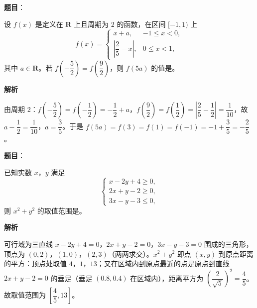 \begin{answer}

\textbf{题目}：

设 \(f(x)\) 是定义在 \(\mathbf{R}\) 上且周期为 2 的函数，在区间 \([-1,1)\) 上
\nopagebreak[4]
\[
f(x)=
\begin{cases}
x+a, & -1\leqslant x<0,\\
\left|\dfrac{2}{5}-x\right|, & 0\leqslant x<1,
\end{cases}
\]
其中 \(a\in\mathbf{R}\)。若 \(f\left(-\dfrac{5}{2}\right)=f\left(\dfrac{9}{2}\right)\)，则 \(f(5a)\) 的值是\gkblank{}。

\textbf{解析}

由周期 2：\(f\left(-\dfrac{5}{2}\right)=f\left(-\dfrac{1}{2}\right)=-\dfrac{1}{2}+a\)，\(f\left(\dfrac{9}{2}\right)=f\left(\dfrac{1}{2}\right)=\left|\dfrac{2}{5}-\dfrac{1}{2}\right|=\dfrac{1}{10}\)，故 \(a-\dfrac{1}{2}=\dfrac{1}{10}\)，\(a=\dfrac{3}{5}\)。于是 \(f(5a)=f(3)=f(1)=f(-1)=-1+\dfrac{3}{5}=-\dfrac{2}{5}\)。


\end{answer}
\begin{answer}

\textbf{题目}：

已知实数 \(x\)，\(y\) 满足
\nopagebreak[4]
\[
\begin{cases}
x-2y+4\geqslant 0,\\
2x+y-2\geqslant 0,\\
3x-y-3\leqslant 0,
\end{cases}
\]
则 \(x^{2}+y^{2}\) 的取值范围是\gkblank{}。

\textbf{解析}

可行域为三直线 \(x-2y+4=0\)，\(2x+y-2=0\)，\(3x-y-3=0\) 围成的三角形，顶点为 \((0,2)\)，\((1,0)\)，\((2,3)\)（两两求交）。\(x^{2}+y^{2}\) 即点 \((x,y)\) 到原点距离的平方：顶点处取值 \(4\)，\(1\)，\(13\)；又在区域内到原点最近的点是原点到直线 \(2x+y-2=0\) 的垂足（垂足 \((0.8,0.4)\) 在区域内），距离平方为 \(\left(\dfrac{2}{\sqrt{5}}\right)^{2}=\dfrac{4}{5}\)。故取值范围为 \(\left[\dfrac{4}{5},13\right]\)。


\end{answer}
